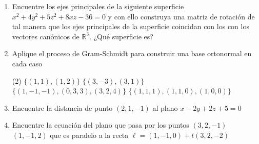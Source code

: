 \documentclass[letterpaper,11pt]{article}
\begin{document}
\begin{enumerate}

\item Encuentre los ejes principales de la siguiente superficie $x^2 + 4y^2 + 5z^2 + 8xz - 36 = 0$ y con ello construya una matriz de rotación de tal manera que los ejes principales de la superficie coincidan con los con los vectores canónicos de $\mathbb{R}^3$. ¿Qué superficie es?   

\item Aplique el proceso de Gram-Schmidt para construir una base ortonormal en cada caso

\begin{tasks}(2)
\task  $\lbrace (1,1), (1,2) \rbrace$
\task $\lbrace (3,-3), (3,1) \rbrace$
\task $\lbrace (1,-1,-1), (0,3,3), (3,2,4) \rbrace$
\task $\lbrace (1,1,1), (1,1,0), (1,0,0) \rbrace$
\end{tasks}

\item Encuentre la distancia de punto $(2,1,-1)$ al plano $x -2y + 2z + 5 = 0$

\item Encuentre la ecuación del plano que pasa por los puntos $(3,2,-1)$ $(1,-1,2)$ que es paralelo a la recta $\ell = (1,-1,0) + t(3,2,-2)$

\end{enumerate}
\end{document}
